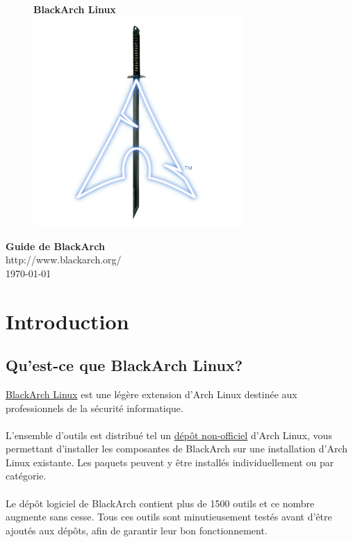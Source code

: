 \documentclass[a4paper, oneside, 11pt]{book}
\begin{document}
\pagestyle{empty}
\begin{center}
\begin{figure}[htbp]
\centering
\vspace{1cm}
\Huge{\textbf{BlackArch \color{red}Linux}}\\
\vspace{2cm}
\includegraphics[width=8cm]{images/logo.png}
\label{fig:logo}
\end{figure}
\vspace{1cm}
\Huge{\textbf{Guide de BlackArch}}\\
\vspace{1cm}
\Large{\color{red}http://www.blackarch.org/}\\
\vspace{0.5cm}
\Large{\today}
\end{center}
\newpage
\tableofcontents
\newpage
\pagestyle{fancy}


\chapter{Introduction}

\section{Qu'est-ce que BlackArch Linux?}
\href{http://www.blackarch.org}{BlackArch Linux} est une légère extension d'Arch
Linux destinée aux professionnels de la sécurité informatique.
\\\\
L'ensemble d'outils est distribué tel un
\href{https://wiki.archlinux.org/index.php/Unofficial\_User\_Repositories}
{dépôt non-officiel} d'Arch Linux, vous permettant d'installer les composantes de
BlackArch sur une installation d'Arch Linux existante. Les paquets peuvent y être
installés individuellement ou par catégorie.
\\\\
Le dépôt logiciel de BlackArch contient plus de 1500 outils et ce nombre augmente
sans cesse. Tous ces outils sont minutieusement testés avant d'être ajoutés aux
dépôts, afin de garantir leur bon fonctionnement.
\end{document}
